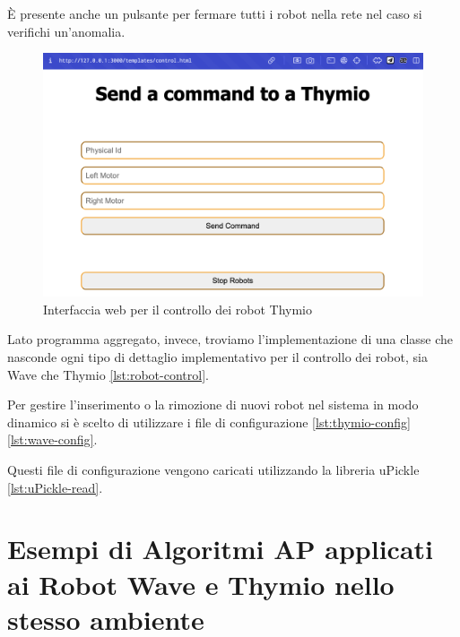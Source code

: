 \documentclass[12pt,a4paper,openright,twoside]{book}
\begin{document}
È presente anche un pulsante per fermare tutti i robot nella rete nel caso si verifichi un'anomalia.

\begin{figure}
    \centering
    \includegraphics[width=.8\linewidth]{figures/web-interface.png}
    \caption{Interfaccia web per il controllo dei robot Thymio}
    \label{fig:web-interface}
\end{figure}

Lato programma aggregato, invece, troviamo l'implementazione di una classe che nasconde ogni tipo di dettaglio implementativo per il controllo dei robot, sia Wave che Thymio \cref{lst:robot-control}.



Per gestire l'inserimento o la rimozione di nuovi robot nel sistema in modo dinamico si è scelto di utilizzare i file di configurazione \cref{lst:thymio-config} \cref{lst:wave-config}.





Questi file di configurazione vengono caricati utilizzando la libreria uPickle \cite{uPickle} \cref{lst:uPickle-read}.



\section{Esempi di Algoritmi AP applicati ai Robot Wave e Thymio nello stesso ambiente}
\end{document}
